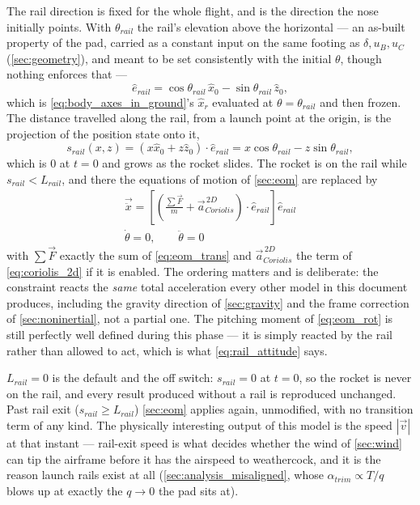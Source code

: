 The rail direction is fixed for the whole flight, and is the direction the nose initially points.
With $\theta_{rail}$ the rail's elevation above the horizontal --- an as-built property of the pad,
carried as a constant input on the same footing as $\delta,u_B,u_C$ (\autoref{sec:geometry}), and
meant to be set consistently with the initial $\theta$, though nothing enforces that ---
\begin{equation} \label{eq:rail_direction}
    \hat{e}_{rail} = \cos\theta_{rail}\,\hat{x}_0 - \sin\theta_{rail}\,\hat{z}_0,
\end{equation}
which is \autoref{eq:body_axes_in_ground}'s $\hat{x}_r$ evaluated at $\theta=\theta_{rail}$ and
then frozen. The distance travelled along the rail, from a launch point at the origin, is the
projection of the position state onto it,
\begin{equation} \label{eq:rail_distance}
    s_{rail}(x,z) = \left(x\hat{x}_0+z\hat{z}_0\right)\cdot\hat{e}_{rail}
        = x\cos\theta_{rail}-z\sin\theta_{rail},
\end{equation}
which is $0$ at $t=0$ and grows as the rocket slides. The rocket is on the rail while
$s_{rail}<L_{rail}$, and there the equations of motion of \autoref{sec:eom} are replaced by
\begin{gather}
    \vec{\ddot{x}} = \left[\left(\frac{\sum\vec{F}}{m}
        + \vec{a}_{Coriolis}^{\,2D}\right)\cdot\hat{e}_{rail}\right]\hat{e}_{rail}
        \label{eq:rail_constraint} \\
    \dot\theta = 0, \qquad \ddot\theta = 0 \label{eq:rail_attitude}
\end{gather}
with $\sum\vec{F}$ exactly the sum of \autoref{eq:eom_trans} and $\vec{a}_{Coriolis}^{\,2D}$ the
term of \autoref{eq:coriolis_2d} if it is enabled. The ordering matters and is deliberate: the
constraint reacts the \emph{same} total acceleration every other model in this document produces,
including the gravity direction of \autoref{sec:gravity} and the frame correction of
\autoref{sec:noninertial}, not a partial one. The pitching moment of \autoref{eq:eom_rot} is still
perfectly well defined during this phase --- it is simply reacted by the rail rather than allowed
to act, which is what \autoref{eq:rail_attitude} says.

$L_{rail}=0$ is the default and the off switch: $s_{rail}=0$ at $t=0$, so the rocket is never on
the rail, and every result produced without a rail is reproduced unchanged. Past rail exit
($s_{rail}\geq L_{rail}$) \autoref{sec:eom} applies again, unmodified, with no transition term of
any kind. The physically interesting output of this model is the speed $|\vec{v}|$ at that instant
--- rail-exit speed is what decides whether the wind of \autoref{sec:wind} can tip the airframe
before it has the airspeed to weathercock, and it is the reason launch rails exist at all
(\autoref{sec:analysis_misaligned}, whose $\alpha_{trim}\propto T/q$ blows up at exactly the
$q\to0$ the pad sits at).

